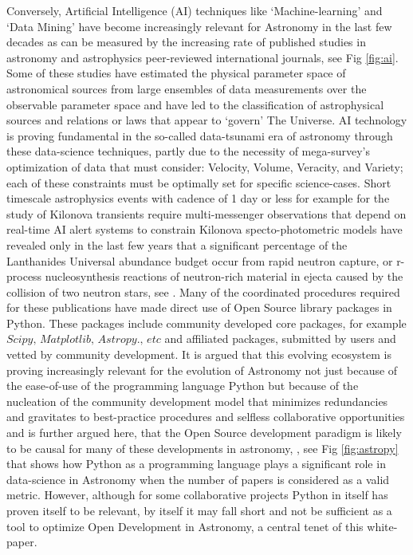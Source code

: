 \documentclass[final,5p,times,twocolumn,authoryear]{elsarticle}
\begin{document}
Conversely, Artificial Intelligence (AI) techniques like `Machine-learning' and `Data Mining'  have become increasingly relevant for Astronomy in the last few decades as can be measured by the increasing rate of published studies in astronomy and astrophysics peer-reviewed international journals, see Fig \ref{fig:ai}. Some of these studies have estimated the physical parameter space of astronomical sources from large ensembles of data measurements over the observable parameter space and have led to the classification of astrophysical sources and relations or laws that appear to `govern' The Universe. AI technology is proving fundamental in the so-called data-tsunami era of astronomy through these data-science techniques, partly due to the necessity of mega-survey's optimization of data that must consider: Velocity, Volume, Veracity, and Variety; each of these constraints must be optimally set for specific science-cases. Short timescale astrophysics events with cadence of 1 day or less for example for the study of Kilonova transients require multi-messenger observations that depend on real-time AI alert systems to constrain Kilonova specto-photometric models have revealed only in the last few years that a significant percentage of the Lanthanides Universal abundance budget occur from rapid neutron capture, or r-process nucleosynthesis reactions of neutron-rich material in 
 ejecta caused by the collision of two neutron stars, see \cite{artola2020}. Many of the coordinated procedures required for these publications have made direct use of Open Source library packages in Python. These packages include community developed core packages, for example $\textit{Scipy, Matplotlib, Astropy., etc}$  and affiliated packages, submitted by users and vetted by community development. It is argued that this evolving ecosystem is proving increasingly relevant for the evolution of Astronomy not just because of the ease-of-use of the programming language Python but because of the nucleation of the community development model that minimizes redundancies and gravitates to best-practice procedures and selfless collaborative opportunities and is further argued here, that the Open Source development paradigm is likely to be causal for many of these developments in astronomy, , see Fig \ref{fig:astropy} that shows how Python as a programming language plays a significant role in data-science in Astronomy when the number of papers is considered as a valid metric.  However, although for some collaborative projects Python in itself has proven itself to be relevant, by itself it may fall short and not be sufficient as a tool to optimize Open Development in Astronomy, a central tenet of this white-paper.
\end{document}
